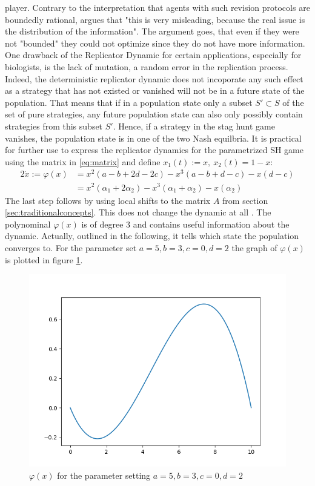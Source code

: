 \documentclass[11pt]{article}
\begin{document}
player. 
Contrary to the interpretation that agents with such revision protocols 
are boundedly rational, \cite{gintis_game_2000} argues that 
"this is very misleading, because the real issue is the distribution of the 
information". The argument goes, that even if they were not "bounded" they 
could not optimize since they do not have more information. 
One drawback of the Replicator Dynamic for certain applications, especially
for biologists, is the lack of mutation, a random error in the replication 
process. Indeed, the deterministic replicator dynamic does not incoporate 
any such effect as a strategy that has not existed or vanished will not 
be in a future state of the population. That means that if in a population 
state only a subset $S' \subset S$ of the set of pure strategies, any future
population state can also only possibly contain strategies from this subset
$S'$. Hence, if a strategy in the stag hunt game vanishes, the population 
state is in one of the two Nash equilbria.
It is practical for further use to express the replicator dynamics for the
parametrized SH game using the matrix in \eqref{eq:matrix} and 
define $x_1(t) := x,\ x_2(t) = 1-x$:
\begin{alignat}{2}
        \label{eq:replicatorpara}
        \dot{x} := \varphi(x) &= x^2(a-b+2d-2c) - x^3(a-b+d-c) -x(d-c) \\
                              &= x^2(\alpha_1+2\alpha_2) 
        - x^3(\alpha_1+\alpha_2) - x(\alpha_2)
\end{alignat}
The last step follows by using local shifts to the matrix $A$ from section
\ref{sec:traditionalconcepts}. This does not change the dynamic at all 
\parencite[73]{weibull_evolutionary_1997}. The polynominal $\varphi(x)$ is
of degree $3$ and contains useful information about the dynamic. Actually, 
outlined in the following, it tells which state the population converges to.
For the parameter set $a=5, b=3, c=0, d=2$ the graph of $\varphi(x)$ is 
plotted in figure 
\ref{fig:polynominal}.
\begin{figure}[h]
        \label{fig:polynominal}
        \centering
        \includegraphics[scale=0.5]{polynominal.png}
        \caption{$\varphi(x)$ for the parameter setting $a=5, b=3, c=0, d=2$}
\end{figure}
\end{document}
